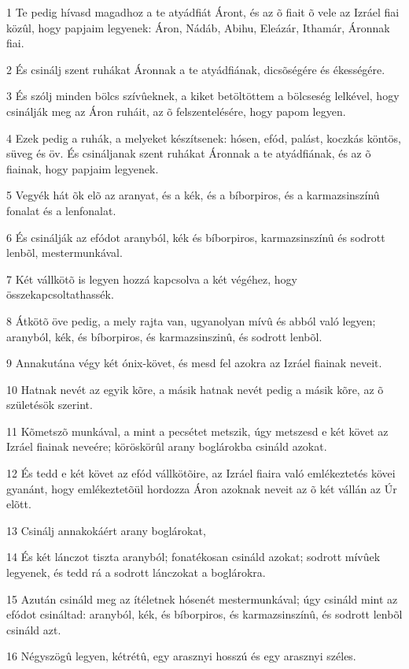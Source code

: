 \par 1 Te pedig hívasd magadhoz a te atyádfiát Áront, és az õ fiait õ vele az Izráel fiai közûl, hogy papjaim legyenek: Áron, Nádáb, Abihu, Eleázár, Ithamár, Áronnak fiai.
\par 2 És csinálj szent ruhákat Áronnak a te atyádfiának, dicsõségére és ékességére.
\par 3 És szólj minden bölcs szívûeknek, a kiket betöltöttem a bölcseség lelkével, hogy csinálják meg az Áron ruháit, az õ felszentelésére, hogy papom legyen.
\par 4 Ezek pedig a ruhák, a melyeket készítsenek: hósen, efód, palást, koczkás köntös, süveg és öv. És csináljanak szent ruhákat Áronnak a te atyádfiának, és az õ fiainak, hogy papjaim legyenek.
\par 5 Vegyék hát õk elõ az aranyat, és a kék, és a bíborpiros, és a karmazsinszínû fonalat és a lenfonalat.
\par 6 És csinálják az efódot aranyból, kék és bíborpiros, karmazsinszínû és sodrott lenbõl, mestermunkával.
\par 7 Két vállkötõ is legyen hozzá kapcsolva a két végéhez, hogy összekapcsoltathassék.
\par 8 Átkötõ öve pedig, a mely rajta van, ugyanolyan mívû és abból való legyen; aranyból, kék, és bíborpiros, és karmazsinszinû, és sodrott lenbõl.
\par 9 Annakutána végy két ónix-követ, és mesd fel azokra az Izráel fiainak neveit.
\par 10 Hatnak nevét az egyik kõre, a másik hatnak nevét pedig a másik kõre, az õ születésök szerint.
\par 11 Kõmetszõ munkával, a mint a pecsétet metszik, úgy metszesd e két követ az Izráel fiainak neveére; köröskörûl arany boglárokba csináld azokat.
\par 12 És tedd e két követ az efód vállkötõire, az Izráel fiaira való emlékeztetés kövei gyanánt, hogy emlékeztetõül hordozza Áron azoknak neveit az õ két vállán az Úr elõtt.
\par 13 Csinálj annakokáért arany boglárokat,
\par 14 És két lánczot tiszta aranyból; fonatékosan csináld azokat; sodrott mívûek legyenek, és tedd rá a sodrott lánczokat a boglárokra.
\par 15 Azután csináld meg az ítéletnek hósenét mestermunkával; úgy csináld mint az efódot csináltad: aranyból, kék, és bíborpiros, és karmazsinszínû, és sodrott lenbõl csináld azt.
\par 16 Négyszögû legyen, kétrétû, egy arasznyi hosszú és egy arasznyi széles.
